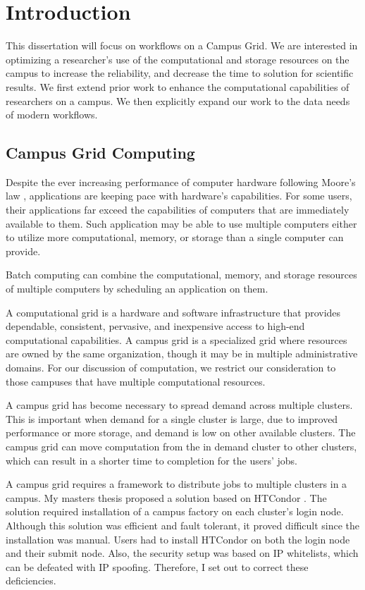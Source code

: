\chapter{Introduction}

This dissertation will focus on workflows on a Campus Grid.  We are interested in optimizing a researcher's use of the computational and storage resources on the campus to increase the reliability, and decrease the time to solution for scientific results.  We first extend prior work to enhance the computational capabilities of researchers on a campus.  We then explicitly expand our work to the data needs of modern workflows.

\section{Campus Grid Computing}

Despite the ever increasing performance of computer hardware following Moore's law \cite{schaller1997moore}, applications are keeping pace with hardware's capabilities.  For some users, their applications far exceed the capabilities of computers that are immediately available to them.  Such application may be able to use multiple computers either to utilize more computational, memory, or storage than a single computer can provide.

Batch computing can combine the computational, memory, and storage resources of multiple computers by scheduling an application on them.  

A computational grid is a hardware and software infrastructure that provides dependable, consistent, pervasive, and inexpensive access to high-end computational capabilities\cite{foster2004grid}.  A campus grid is a specialized grid where resources are owned by the same organization, though it may be in multiple administrative domains.  For our discussion of computation, we restrict our consideration to those campuses that have multiple computational resources.

A campus grid has become necessary to spread demand across multiple clusters.  This is important when demand for a single cluster is large, due to improved performance or more storage, and demand is low on other available clusters.  The campus grid can move computation from the in demand cluster to other clusters, which can result in a shorter time to completion for the users' jobs.

A campus grid requires a framework to distribute jobs to multiple clusters in a campus.  My masters thesis \cite{weitzel2011campus} proposed a solution based on HTCondor \cite{litzkow1988condor}.  The solution required installation of a campus factory \cite{website:campusfactory} on each cluster's login node.  Although this solution was efficient and fault tolerant, it proved difficult since the installation was manual.  Users had to install HTCondor on both the login node and their submit node.  Also, the security setup was based on IP whitelists, which can be defeated with IP spoofing.  Therefore, I set out to correct these deficiencies.

